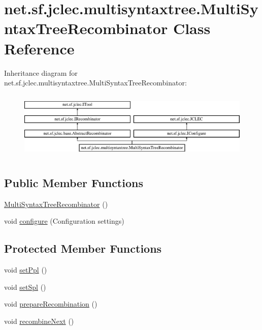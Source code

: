 \hypertarget{classnet_1_1sf_1_1jclec_1_1multisyntaxtree_1_1_multi_syntax_tree_recombinator}{\section{net.\-sf.\-jclec.\-multisyntaxtree.\-Multi\-Syntax\-Tree\-Recombinator Class Reference}
\label{classnet_1_1sf_1_1jclec_1_1multisyntaxtree_1_1_multi_syntax_tree_recombinator}
}
Inheritance diagram for net.\-sf.\-jclec.\-multisyntaxtree.\-Multi\-Syntax\-Tree\-Recombinator\-:\begin{figure}[H]
\begin{center}
\leavevmode
\includegraphics[height=3.284458cm]{classnet_1_1sf_1_1jclec_1_1multisyntaxtree_1_1_multi_syntax_tree_recombinator}
\end{center}
\end{figure}
\subsection*{Public Member Functions}
\begin{DoxyCompactItemize}
\item 
\hyperlink{classnet_1_1sf_1_1jclec_1_1multisyntaxtree_1_1_multi_syntax_tree_recombinator_abcab402be1c6240012a84d339e515b30}{Multi\-Syntax\-Tree\-Recombinator} ()
\item 
void \hyperlink{classnet_1_1sf_1_1jclec_1_1multisyntaxtree_1_1_multi_syntax_tree_recombinator_af4b8c6df70d8826badc5596ff0bce3d0}{configure} (Configuration settings)
\end{DoxyCompactItemize}
\subsection*{Protected Member Functions}
\begin{DoxyCompactItemize}
\item 
void \hyperlink{classnet_1_1sf_1_1jclec_1_1multisyntaxtree_1_1_multi_syntax_tree_recombinator_a14b79cf615140c1496936dd754a773f1}{set\-Ppl} ()
\item 
void \hyperlink{classnet_1_1sf_1_1jclec_1_1multisyntaxtree_1_1_multi_syntax_tree_recombinator_ac3abef3af27a82bc02fbf2965136c150}{set\-Spl} ()
\item 
void \hyperlink{classnet_1_1sf_1_1jclec_1_1multisyntaxtree_1_1_multi_syntax_tree_recombinator_ad3ba0fcbbd052ec166f1ae11d1d8fa62}{prepare\-Recombination} ()
\item 
void \hyperlink{classnet_1_1sf_1_1jclec_1_1multisyntaxtree_1_1_multi_syntax_tree_recombinator_aa9a6b30a296025db8ed66df1770017a8}{recombine\-Next} ()
\end{DoxyCompactItemize}
